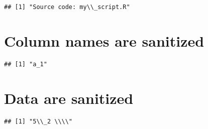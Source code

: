 \documentclass[
]{article}
\newenvironment{Shaded}{\begin{snugshade}}{\end{snugshade}}
\newcommand{\DataTypeTok}[1]{\textcolor[rgb]{0.13,0.29,0.53}{#1}}
\newcommand{\DecValTok}[1]{\textcolor[rgb]{0.00,0.00,0.81}{#1}}
\newcommand{\KeywordTok}[1]{\textcolor[rgb]{0.13,0.29,0.53}{\textbf{#1}}}
\newcommand{\NormalTok}[1]{#1}
\newcommand{\OperatorTok}[1]{\textcolor[rgb]{0.81,0.36,0.00}{\textbf{#1}}}
\newcommand{\OtherTok}[1]{\textcolor[rgb]{0.56,0.35,0.01}{#1}}
\newcommand{\StringTok}[1]{\textcolor[rgb]{0.31,0.60,0.02}{#1}}
\begin{document}
\begin{verbatim}
## [1] "Source code: my\\_script.R"
\end{verbatim}

\hypertarget{column-names-are-sanitized}{%
\section{Column names are sanitized}\label{column-names-are-sanitized}}

\begin{Shaded}
\end{Shaded}

\begin{verbatim}
## [1] "a_1"
\end{verbatim}

\hypertarget{data-are-sanitized}{%
\section{Data are sanitized}\label{data-are-sanitized}}

\begin{Shaded}
\end{Shaded}

\begin{verbatim}
## [1] "5\\_2 \\\\"
\end{verbatim}
\end{document}
